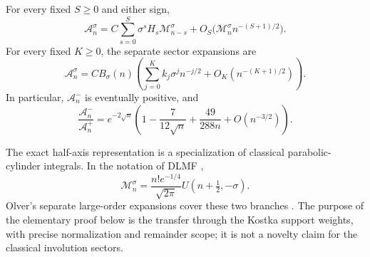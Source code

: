 \begin{theorem}\label{tks:thm:sectors}
For every fixed $S\geq0$ and either sign,
\begin{equation}\label{tks:eq:sectorsupport}
\mathcal A_n^\sigma
 =C\sum_{s=0}^{S}\sigma^sH_s\mathcal M_{n-s}^\sigma
  +O_S\bigl(\mathcal M_n^\sigma n^{-(S+1)/2}\bigr).
\end{equation}
For every fixed $K\geq0$, the separate sector expansions are
\begin{equation}\label{tks:eq:sectorseries}
\mathcal A_n^\sigma=CB_\sigma(n)
 \left(\sum_{j=0}^{K}k_j\sigma^j n^{-j/2}
                    +O_K(n^{-(K+1)/2})\right).
\end{equation}
In particular, $\mathcal A_n^-$ is eventually positive, and
\begin{equation}\label{tks:eq:sectorratio}
\frac{\mathcal A_n^-}{\mathcal A_n^+}
 =e^{-2\sqrt n}\left(1-\frac7{12\sqrt n}
                         +\frac{49}{288n}+O(n^{-3/2})\right).
\end{equation}
\end{theorem}

The exact half-axis representation is a specialization of classical parabolic-cylinder integrals. In the notation of DLMF \cite[(12.5.1)]{DLMF},
\begin{equation}\label{tks:eq:parabolic}
\mathcal M_n^\sigma
  =\frac{n!e^{-1/4}}{\sqrt{2\pi}}U(n+\tfrac12,-\sigma).
\end{equation}
Olver's separate large-order expansions cover these two branches \cite[\S11]{Olver}. The purpose of the elementary proof below is the transfer through the Kostka support weights, with precise normalization and remainder scope; it is not a novelty claim for the classical involution sectors.

